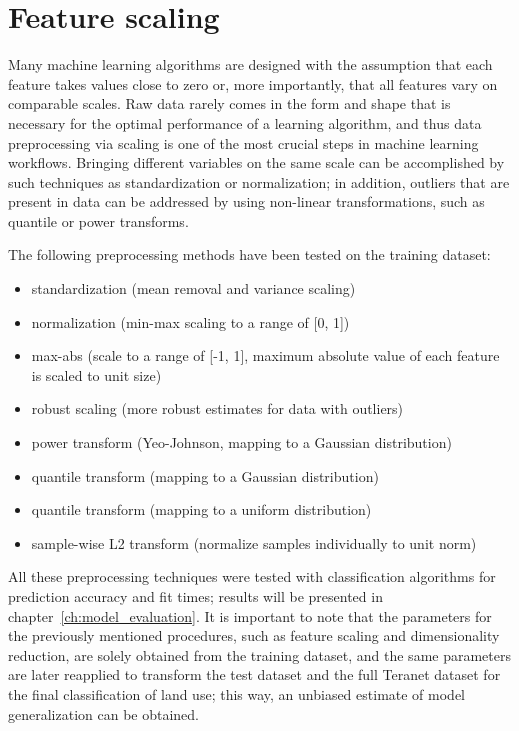 \section{Feature scaling} \label{sec:feature_scaling}

Many machine learning algorithms are designed with the assumption that each feature takes values close to zero or, more importantly, that all features vary on comparable scales\cite{Scikit-learndevelopers2019b}.
Raw data rarely comes in the form and shape that is necessary for the optimal performance of a learning algorithm, and thus data preprocessing via scaling is one of the most crucial steps in machine learning workflows\cite{RaschkaMirjalili2017}.
Bringing different variables on the same scale can be accomplished by such techniques as standardization or normalization;
in addition, outliers that are present in data can be addressed by using non-linear transformations, such as quantile or power transforms.

\vspace{5mm}

The following preprocessing methods have been tested on the training dataset:

\begin{itemize}
    \item standardization (mean removal and variance scaling)
    \item normalization (min-max scaling to a range of [0, 1])
    \item max-abs (scale to a range of [-1, 1], maximum absolute value of each feature is scaled to unit size)
    \item robust scaling (more robust estimates for data with outliers)
    \item power transform (Yeo-Johnson, mapping to a Gaussian distribution)
    \item quantile transform (mapping to a Gaussian distribution)
    \item quantile transform (mapping to a uniform distribution)
    \item sample-wise L2 transform (normalize samples individually to unit norm)
\end{itemize}

All these preprocessing techniques were tested with classification algorithms for prediction accuracy and fit times;
results will be presented in chapter~\ref{ch:model_evaluation}.
It is important to note that the parameters for the previously mentioned procedures, such as feature scaling and dimensionality reduction, are solely obtained from the training dataset, and the same parameters are later reapplied to transform the test dataset and the full Teranet dataset for the final classification of land use;
this way, an unbiased estimate of model generalization can be obtained.

